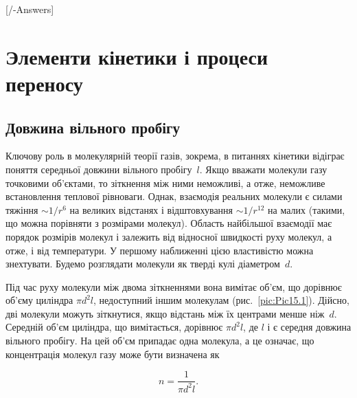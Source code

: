 

[\currfilebase/\currfilebase-Answers]
\chapter{Элементи кінетики і процеси переносу}\label{\currfilebase}
\graphicspath{{\currfilebase/pictures}}
\makeatletter
{}
\makeatother

\section{Довжина вільного пробігу}

Ключову роль в молекулярній теорії газів, зокрема, в питаннях кінетики відіграє
поняття середньої довжини вільного пробігу~$l$. Якщо вважати молекули газу
точковими об'єктами, то зіткнення між ними неможливі, а отже, неможливе
встановлення теплової рівноваги. Однак, взаємодія реальних молекули є силами
тяжіння $\sim 1/r^6$ на великих відстанях і відштовхування $\sim 1/r^{12}$ на
малих (такими, що можна порівняти з розмірами молекул). Область найбільшої
взаємодії має порядок розмірів молекул і залежить від відносної швидкості руху
молекул, а отже, і від температури. У першому наближенні цією властивістю можна
знехтувати. Будемо розглядати молекули як тверді кулі діаметром~$d$.

Під час руху молекули між двома зіткненнями вона вимітає об’єм, що дорівнює
об'єму циліндра $\pi d^2 l$, недоступний іншим молекулам
(рис.~\ref{pic:Pic15.1}). Дійсно, дві молекули можуть зіткнутися, якщо
відстань між їх центрами менше ніж~$d$. Середній об’єм циліндра, що вимітається,
дорівнює $\pi d^2 l$, де $l$ і є середня довжина вільного пробігу. На цей об’єм
припадає одна молекула, а це означає, що концентрація молекул газу може бути
визначена як

\begin{equation}
	n = \frac{1}{\pi d^2 l}.
	\label{eq:150.1}
\end{equation}

